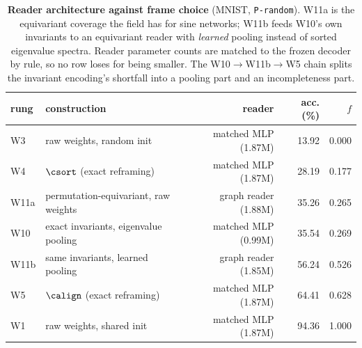 \begin{table}[t]
\centering\small
\caption{\textbf{Reader architecture against frame choice} (MNIST, \texttt{P-random}). W11a is the equivariant coverage the field has for sine networks; W11b feeds W10's own invariants to an equivariant reader with \emph{learned} pooling instead of sorted eigenvalue spectra. Reader parameter counts are matched to the frozen decoder by rule, so no row loses for being smaller. The W10$\to$W11b$\to$W5 chain splits the invariant encoding's shortfall into a pooling part and an incompleteness part.}
\label{tab:w11}
\begin{tabular}{@{}llrrr@{}}
\toprule
rung & construction & reader & acc. (\%) & $f$ \\
\midrule
W3 & raw weights, random init & matched MLP (1.87M) & 13.92 & 0.000 \\
W4 & $\csort$ (exact reframing) & matched MLP (1.87M) & 28.19 & 0.177 \\
W11a & permutation-equivariant, raw weights & graph reader (1.88M) & 35.26 & 0.265 \\
\midrule
W10 & exact invariants, eigenvalue pooling & matched MLP (0.99M) & 35.54 & 0.269 \\
W11b & same invariants, learned pooling & graph reader (1.85M) & 56.24 & 0.526 \\
\midrule
W5 & $\calign$ (exact reframing) & matched MLP (1.87M) & 64.41 & 0.628 \\
W1 & raw weights, shared init & matched MLP (1.87M) & 94.36 & 1.000 \\
\bottomrule
\end{tabular}
\end{table}
